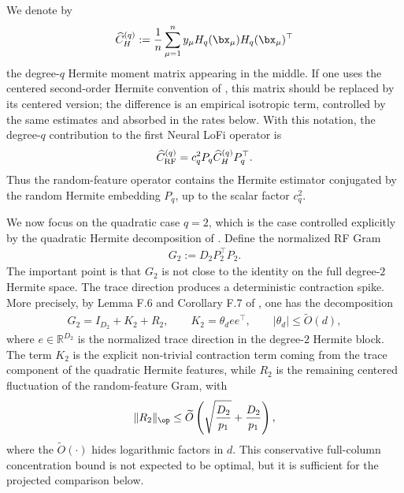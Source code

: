 We denote by
\begin{align}
    \widehat C_H^{(q)}
    :=
    \frac1n
    \sum_{\mu=1}^n
    y_\mu
    H_q(\bx_\mu)H_q(\bx_\mu)^\top
\end{align}
the degree-$q$ Hermite moment matrix appearing in the middle. If one uses the centered second-order Hermite convention of \cite{tabanelli2026deep}, this matrix should be replaced by its centered version; the difference is an empirical isotropic term, controlled by the same estimates and absorbed in the rates below. With this notation, the degree-$q$ contribution to
the first Neural LoFi operator is
\begin{align}
    \widehat C_{\rm RF}^{(q)}
    =
    c_q^2
    P_q
    \widehat C_H^{(q)}
    P_q^\top .
\end{align}
Thus the random-feature operator contains the Hermite estimator conjugated by the random
Hermite embedding $P_q$, up to the scalar factor $c_q^2$.

We now focus on the quadratic case $q=2$, which is the case controlled explicitly by the quadratic Hermite decomposition of \cite{wen2025when}. Define the normalized RF Gram
\begin{align}
    G_2
    :=
    D_2 P_2^\top P_2 .
\end{align}
The important point is that $G_2$ is not close to the identity on the full degree-$2$ Hermite space. The trace direction produces a deterministic contraction spike. More precisely, by Lemma F.6 and Corollary F.7 of \cite{wen2025when}, one has the decomposition
\begin{align}
    G_2
    =
    I_{D_2}
    +
    K_2
    +
    R_2,
    \qquad
    K_2=\theta_d ee^\top,
    \qquad
    |\theta_d|\le \widetilde O(d),
\end{align}
where $e\in\mathbb R^{D_2}$ is the normalized trace direction in the degree-$2$ Hermite block. The term $K_2$ is the explicit non-trivial contraction term coming from the trace component of the quadratic Hermite features, while $R_2$ is the remaining centered fluctuation of the random-feature Gram, with
\begin{align}
    \|R_2\|_{\op}
    \le
    \widetilde O \left(
        \sqrt{\frac{D_2}{p_1}}
        +
        \frac{D_2}{p_1}
    \right),
\end{align}
where the $\widetilde O(\cdot)$ hides logarithmic factors in $d$. This conservative full-column concentration bound is not expected to be optimal, but it is sufficient for the projected comparison below.

